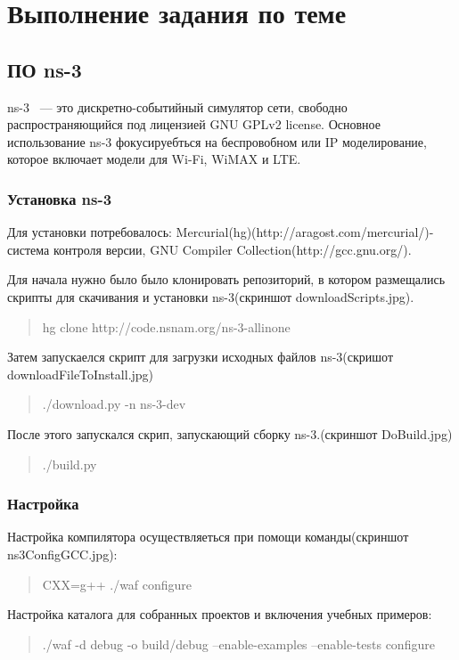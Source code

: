 \documentclass[14pt,a4paper]{article}
\begin{document}
\section{Выполнение задания по теме}
\subsection{ПО ns-3}
ns-3\cite{ns3W:website} ~--- это дискретно-событийный симулятор сети, свободно
распространяющийся под лицензией  GNU GPLv2 license. Основное использование ns-3 фокусируебться на
беспровобном или IP моделирование, которое включает модели для Wi-Fi, WiMAX и
LTE.
\subsubsection{Установка ns-3}
Для установки потребовалось:
Mercurial(hg)(http://aragost.com/mercurial/)-система контроля версии,
GNU Compiler Collection(http://gcc.gnu.org/).

Для начала нужно было было клонировать репозиторий, в котором размещались
скрипты для скачивания и установки ns-3(скриншот downloadScripts.jpg).
\begin{quote}
hg clone http://code.nsnam.org/ns-3-allinone
\end{quote}
\vspace{0.75cm}
Затем запускаелся скрипт для загрузки исходных файлов ns-3(скришот
downloadFileToInstall.jpg)
\begin{quote}
./download.py -n ns-3-dev
\end{quote}
\vspace{0.75cm}
После этого запускался скрип, запускающий сборку ns-3.(скриншот DoBuild.jpg) 
\begin{quote}
./build.py
\end{quote}
\vspace{0.75cm}
\subsubsection{Настройка}
Настройка компилятора осуществляеться при помощи команды(скриншот
ns3ConfigGCC.jpg):
\begin{quote}
CXX=g++ ./waf configure
\end{quote}
\vspace{0.75cm}
Настройка каталога для собранных проектов и включения учебных примеров:
\begin{quote}
./waf -d debug -o build/debug --enable-examples --enable-tests configure
\end{quote}
\vspace{0.75cm}
\end{document}
